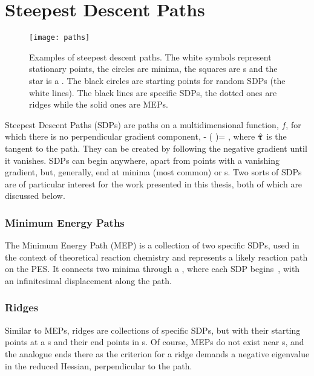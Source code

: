 \section{Steepest Descent Paths}
\label{sec:sdps}
\begin{figure}[h]
  \begin{center}
    \texttt{[image: paths]}
    \parbox{0.85\linewidth}{
      \caption{Examples of steepest descent paths.
The white symbols represent stationary points, the circles are minima, the squares are s and the star is a .
The black circles are starting points for random SDPs (the white lines).
The black lines are specific SDPs, the dotted ones are ridges while the solid ones are MEPs.
      }
      \label{fig:paths}
    }
  \end{center}
\end{figure}

Steepest Descent Paths (SDPs) are paths on a multidimensional function, $f$, for which there is no perpendicular gradient component,
\nabla {} - (\nabla {} \cdot \uvt)\uvt = ,
\eeq
where $\hat{{\mathrm{\mathbf{\bm{\uptau}}}}}$ is the tangent to the path.
They can be created by following the negative gradient until it vanishes.
SDPs can begin anywhere, apart from points with a vanishing gradient, but, generally, end at minima (most common) or \sap{}s.
Two sorts of SDPs are of particular interest for the work presented in this thesis, both of which are discussed below.

\subsubsection{Minimum Energy Paths}
The Minimum Energy Path (MEP) is a collection of two specific SDPs, used in the context of theoretical reaction chemistry and represents a likely reaction path on the PES.
It connects two minima through a , where each SDP begins~\cite{neb-polemic-henkelman1}, with an infinitesimal displacement along the path.

\subsubsection{Ridges}
Similar to MEPs, ridges are collections of specific SDPs, but with their starting points at a s and their end points in s.
Of course, MEPs do not exist near s, and the analogue ends there as the criterion for a ridge demands a negative eigenvalue in the reduced Hessian, perpendicular to the path.
